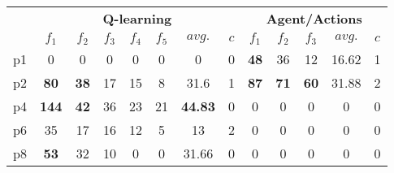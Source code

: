 
\begin{tabular}{ c | ccccccc | ccccc } %
\toprule
& \multicolumn{7}{c|}{\textbf{Q-learning}} & \multicolumn{5}{c}{\textbf{Agent/Actions}} \\ %

& $f_1$ & $f_2$  & $f_3$  & $f_4$ & $f_5$ & $avg.$ & $c$ 
& $f_1$ & $f_2$  & $f_3$  & $avg.$ & $c$ \\
\midrule

p1 &  0 & 0  &  0  &  0  &  0 &  0  &  0 
     & \textbf{{\color{red}48}} & 36  &  12  &  16.62  &  1   \\

p2 & \textbf{{\color{red}80}} & \textbf{{\color{red}38}}  &  17  &  15  &  8 &  31.6  &  1
    &  \textbf{{\color{red}87}}  &  \textbf{{\color{red}71}}  &  \textbf{{\color{red}60}} &  31.88  &  2   \\

p4 &  \textbf{{\color{red}144}} & \textbf{{\color{red}42}}  &  36  &  23  &  21 &  \textbf{{\color{red}44.83}}  &  0 
     & 0 & 0  &  0  &  0  &  0   \\

p6 &  35 & 17  &  16  &  12  &  5 &  13  &  2 
    & 0 & 0  &  0  &  0  &  0   \\

p8 &  \textbf{{\color{red}53}} & 32  &  10  &  0  &  0 &  31.66  &  0 
    & 0 & 0  &  0  &  0  &  0   \\

\bottomrule
\end{tabular}

